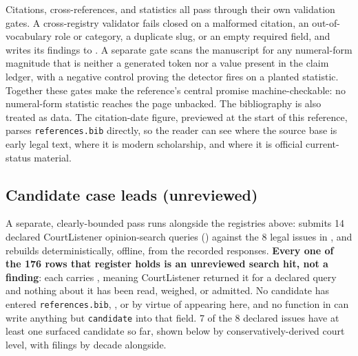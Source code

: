 \documentclass[
  english,
]{article}
\begin{document}
Citations, cross-references, and statistics all pass through their own
validation gates. A cross-registry validator fails closed on a malformed
citation, an out-of-vocabulary role or category, a duplicate slug, or an
empty required field, and writes its findings to
. A separate gate scans the
manuscript for any numeral-form magnitude that is neither a generated
token nor a value present in the claim ledger, with a negative control
proving the detector fires on a planted statistic. Together these gates
make the reference's central promise machine-checkable: no numeral-form
statistic reaches the page unbacked. The bibliography is also treated as
data. The citation-date figure, previewed at the start of this
reference, parses \texttt{references.bib} directly, so the reader can
see where the source base is early legal text, where it is modern
scholarship, and where it is official current-status material.

\subsection{Candidate case leads
(unreviewed)}\label{candidate-case-leads-unreviewed}

A separate, clearly-bounded pass runs alongside the registries above:
 submits 14 declared
CourtListener opinion-search queries
() against the 8 legal
issues in , and
 rebuilds
 deterministically, offline, from the
recorded responses. \textbf{Every one of the 176 rows that register
holds is an unreviewed search hit, not a finding}: each carries
, meaning CourtListener returned it for a
declared query and nothing about it has been read, weighed, or admitted.
No candidate has entered \texttt{references.bib},
, or  by
virtue of appearing here, and no function in
 can write anything but
\texttt{candidate} into that field. 7 of the 8 declared issues have at
least one surfaced candidate so far, shown below by
conservatively-derived court level, with filings by decade alongside.
\end{document}
